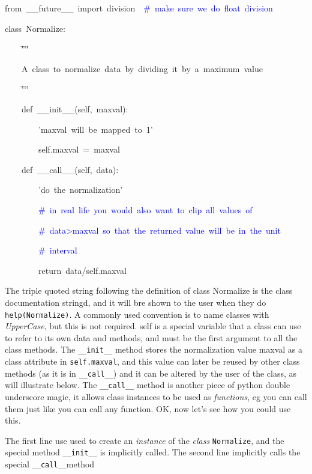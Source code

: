 \begin{lyxcode}
from~\_\_future\_\_~import~division~~\textcolor{blue}{\#~make~sure~we~do~float~division}

class~Normalize:

~~~~\char`\"{}\char`\"{}\char`\"{}

~~~~A~class~to~normalize~data~by~dividing~it~by~a~maximum~value

~~~~\char`\"{}\char`\"{}\char`\"{}

~~~~def~\_\_init\_\_(self,~maxval):

~~~~~~~~'maxval~will~be~mapped~to~1'

~~~~~~~~self.maxval~=~maxval

~~~~def~\_\_call\_\_(self,~data):

~~~~~~~~'do~the~normalization'

~~~~~~~~\textcolor{blue}{\#~in~real~life~you~would~also~want~to~clip~all~values~of}

~\textcolor{blue}{~~~~~~~\#~data>maxval~so~that~the~returned~value~will~be~in~the~unit}

~\textcolor{blue}{~~~~~~~\#~interval}

~~~~~~~~return~data/self.maxval
\end{lyxcode}
The triple quoted string following the definition of class Normalize
is the class documentation stringd, and it will bre shown to the user
when they do \texttt{help(Normalize)}. A commonly used convention
is to name classes with \textit{UpperCase}, but this is not required.
self is a special variable that a class can use to refer to its own
data and methods, and must be the first argument to all the class
methods. The \texttt{\_\_init\_\_} method stores the normalization
value maxval as a class attribute in \texttt{self.maxval}, and this
value can later be reused by other class methods (as it is in \texttt{\_\_call\_\_})
and it can be altered by the user of the class, as will illustrate
below. The \texttt{\_\_call\_\_} method is another piece of python
double underscore magic, it allows class instances to be used as \textit{functions},
eg you can call them just like you can call any function. OK, now
let's see how you could use this. 

The first line use used to create an \textit{instance} of the \textit{class}
\texttt{Normalize}, and the special method \texttt{\_\_init\_\_} is
implicitly called. The second line implicitly calls the special \texttt{\_\_call\_\_}method

